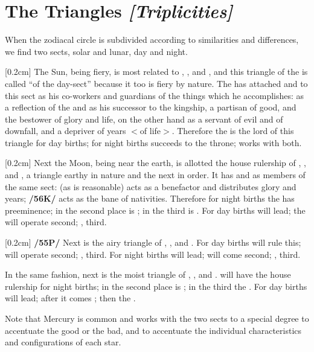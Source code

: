\section{The Triangles \textit{[Triplicities]}}

When the zodiacal circle is subdivided according to similarities and differences, we find two sects, solar and lunar, day and night. 

[0.2cm]
The Sun, being fiery, is most related to \Aries, \Leo, and \Sagittarius, and this triangle of the \Sun\xspace is called “of the day-sect” because it too is fiery by nature. The \Sun\xspace has attached \Jupiter\xspace and \Saturn\xspace to this sect as his co-workers and guardians of the things which he accomplishes: \Jupiter\xspace as a reflection of the \Sun\xspace and as his successor to the kingship, a partisan of good, and the bestower of glory
and life, \Saturn\xspace on the other hand as a servant of evil and of downfall, and a depriver of years $<$of life$>$. Therefore the \Sun\xspace is the lord of this triangle for day births; for night births \Jupiter\xspace succeeds to the throne; \Saturn\xspace works with both.

[0.2cm]
Next the Moon, being near the earth, is allotted the house rulership of \Taurus, \Virgo, and \Capricorn, a triangle earthy in nature and the next in order. It has \Venus\xspace and \Mars\xspace as members of the same sect: \Venus\xspace
(as is reasonable) acts as a benefactor and distributes glory and years; \textbf{/56K/} \Mars\xspace acts as the bane of
nativities. Therefore for night births the \Moon\xspace has preeminence; in the second place is \Venus; in the third
is \Mars. For day births \Venus\xspace will lead; the \Moon\xspace will operate second; \Mars, third.

[0.2cm]
\textbf{/55P/} Next is the airy triangle of \Gemini, \Libra, and \Aquarius. For day births \Saturn\xspace will rule this;
\Mercury\xspace will operate second; \Jupiter, third. For night births \Mercury\xspace will lead; \Saturn\xspace will come second; \Jupiter, third.

In the same fashion, next is the moist triangle of \Cancer, \Scorpio, and \Pisces. \Mars\xspace will have the house rulership for night births; in the second place is \Venus; in the third the \Moon. For day births \Venus\xspace will lead; after it comes \Mars; then the \Moon. 

\mndl[0.2cm]
Note that Mercury is common and works with the two sects to a special degree to accentuate the good or the bad, and to accentuate the individual characteristics and configurations of each star.

\newpage